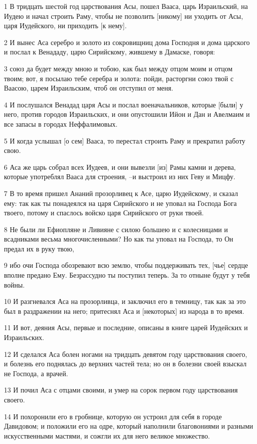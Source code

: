 \par 1 В тридцать шестой год царствования Асы, пошел Вааса, царь Израильский, на Иудею и начал строить Раму, чтобы не позволить [никому] ни уходить от Асы, царя Иудейского, ни приходить [к нему].
\par 2 И вынес Аса серебро и золото из сокровищниц дома Господня и дома царского и послал к Венададу, царю Сирийскому, жившему в Дамаске, говоря:
\par 3 союз да будет между мною и тобою, как был между отцом моим и отцом твоим; вот, я посылаю тебе серебра и золота: пойди, расторгни союз твой с Ваасою, царем Израильским, чтоб он отступил от меня.
\par 4 И послушался Венадад царя Асы и послал военачальников, которые [были] у него, против городов Израильских, и они опустошили Ийон и Дан и Авелмаим и все запасы в городах Неффалимовых.
\par 5 И когда услышал [о сем] Вааса, то перестал строить Раму и прекратил работу свою.
\par 6 Аса же царь собрал всех Иудеев, и они вывезли [из] Рамы камни и дерева, которые употреблял Вааса для строения, --и выстроил из них Геву и Мицфу.
\par 7 В то время пришел Ананий прозорливец к Асе, царю Иудейскому, и сказал ему: так как ты понадеялся на царя Сирийского и не уповал на Господа Бога твоего, потому и спаслось войско царя Сирийского от руки твоей.
\par 8 Не были ли Ефиопляне и Ливияне с силою большею и с колесницами и всадниками весьма многочисленными? Но как ты уповал на Господа, то Он предал их в руку твою,
\par 9 ибо очи Господа обозревают всю землю, чтобы поддерживать тех, [чье] сердце вполне предано Ему. Безрассудно ты поступил теперь. За то отныне будут у тебя войны.
\par 10 И разгневался Аса на прозорливца, и заключил его в темницу, так как за это был в раздражении на него; притеснял Аса и [некоторых] из народа в то время.
\par 11 И вот, деяния Асы, первые и последние, описаны в книге царей Иудейских и Израильских.
\par 12 И сделался Аса болен ногами на тридцать девятом году царствования своего, и болезнь его поднялась до верхних частей тела; но он в болезни своей взыскал не Господа, а врачей.
\par 13 И почил Аса с отцами своими, и умер на сорок первом году царствования своего.
\par 14 И похоронили его в гробнице, которую он устроил для себя в городе Давидовом; и положили его на одре, который наполнили благовониями и разными искусственными мастями, и сожгли их для него великое множество.

